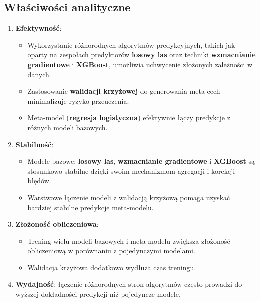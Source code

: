 \subsection{Właściwości analityczne}
\begin{enumerate}
	\def\labelenumi{\arabic{enumi}.}
	\item
	      \textbf{Efektywność}:
	      \begin{itemize}
		      \item Wykorzystanie różnorodnych algorytmów predykcyjnych, takich jak oparty na zespołach predyktorów \textbf{losowy las} oraz techniki \textbf{wzmacnianie gradientowe} i \textbf{XGBoost}, umożliwia uchwycenie złożonych zależności w danych.
		      \item Zastosowanie \textbf{walidacji krzyżowej} do generowania meta-cech minimalizuje ryzyko przeuczenia.
		      \item Meta-model (\textbf{regresja logistyczna}) efektywnie łączy predykcje z różnych modeli bazowych.
	      \end{itemize}
	\item
	      \textbf{Stabilność}:
	      \begin{itemize}
		      \item Modele bazowe: \textbf{losowy las}, \textbf{wzmacnianie gradientowe} i \textbf{XGBoost} są stosunkowo stabilne dzięki swoim mechanizmom agregacji i korekcji błędów.
		      \item Warstwowe łączenie modeli z walidacją krzyżową pomaga uzyskać bardziej stabilne predykcje meta-modelu.
	      \end{itemize}
	\item
	      \textbf{Złożoność obliczeniowa}:
	      \begin{itemize}
		      \item Trening wielu modeli bazowych i meta-modelu zwiększa złożoność obliczeniową w porównaniu z pojedynczymi modelami.
		      \item Walidacja krzyżowa dodatkowo wydłuża czas treningu.
	      \end{itemize}
	\item
	      \textbf{Wydajność}: łączenie różnorodnych stron algorytmów często prowadzi do wyższej dokładności predykcji niż pojedyncze modele.
\end{enumerate}